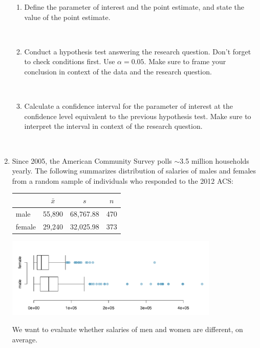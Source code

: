 \documentclass[12pt]{article}
\newcommand{\soln}[2]{$\:$\\ \vspace{#1}}{}
\begin{document}
\begin{enumerate}
\begin{enumerate}
\item Define the parameter of interest and the point estimate, and state the value of the point estimate.

\soln{4cm}{}

\pagebreak

\item Conduct a hypothesis test answering the research question. Don't forget to check conditions first. 
Use $\alpha = 0.05$. Make sure to frame your conclusion in context of the data and the research question.

\soln{5cm}{}

\item Calculate a confidence interval for the parameter of interest at the confidence level equivalent 
to the previous hypothesis test. Make sure to interpret the interval in context of the research question.

\soln{6cm}{}

\end{enumerate}

%

\item Since 2005, the American Community Survey polls $\sim$3.5 million households yearly. The 
following summarizes distribution of salaries of males and females from a random sample of 
individuals who responded to the 2012 ACS:

\begin{center}
%
{\small
\begin{tabular}{lccc}
\hline
			& $\bar{x}$ 	& $s$	& $n$ \\
\hline
male			& 55,890		& 68,767.88	& 470 \\
female		& 29,240		& 32,025.98	& 373 \\
\hline
\end{tabular}
}
%
\includegraphics[width=0.8\textwidth]{figures/acs/sal_gen_box}
\end{center}
We want to evaluate whether salaries of men and women are different, on average.

\begin{enumerate}


\end{enumerate}
\end{enumerate}
\end{document}

